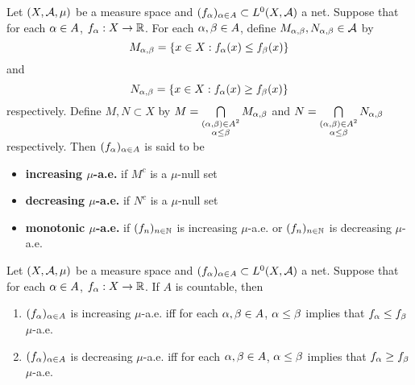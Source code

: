 \documentclass{book}
\begin{document}
	\begin{defn} 
		Let $(X, \mathcal{A}, \mu)$ be a measure space and $(f_\alpha)_{\alpha \in A} \subset L^0(X, \mathcal{A})$ a net. Suppose that for each $\alpha \in A$, $f_{\alpha}:X \rightarrow \mathbb{R}$. For each $\alpha, \beta \in A$, define $M_{\alpha, \beta}, N_{\alpha, \beta} \in \mathcal{A}$ by
		$$M_{\alpha, \beta} = \{x \in X: f_{\alpha}(x) \leq f_{\beta}(x) \}$$ 
		and 
		$$N_{\alpha, \beta} = \{x \in X: f_{\alpha}(x) \geq f_{\beta}(x) \}$$
		respectively. Define $M,N \subset X$ by $M = \bigcap\limits_{\substack{(\alpha, \beta) \in A^2 \\ \alpha \leq \beta}} M_{\alpha, \beta}$ and $N = \bigcap\limits_{\substack{(\alpha, \beta) \in A^2 \\ \alpha \leq \beta}} N_{\alpha, \beta}$ respectively. Then $(f_{\alpha})_{\alpha \in A}$ is said to be 
		\begin{itemize}
			\item \textbf{increasing $\mu$-a.e.} if $M^c$ is a $\mu$-null set
			\item \textbf{decreasing $\mu$-a.e.} if $N^c$ is a $\mu$-null set
			\item \textbf{monotonic $\mu$-a.e.} if $(f_n)_{n \in \mathbb{N}}$ is increasing $\mu$-a.e. or $(f_n)_{n \in \mathbb{N}}$ is decreasing $\mu$-a.e.
		\end{itemize} 
	\end{defn}

	\begin{ex} 
		Let $(X, \mathcal{A}, \mu)$ be a measure space and $(f_\alpha)_{\alpha \in A} \subset L^0(X, \mathcal{A})$ a net. Suppose that for each $\alpha \in A$, $f_{\alpha}:X \rightarrow \mathbb{R}$. If $A$ is countable, then 
		\begin{enumerate}
			\item $(f_\alpha)_{\alpha \in A}$ is increasing $\mu$-a.e. iff for each $\alpha, \beta \in A$, $\alpha \leq \beta$ implies that $f_{\alpha} \leq f_{\beta}$ $\mu$-a.e.
			\item $(f_\alpha)_{\alpha \in A}$ is decreasing $\mu$-a.e. iff for each $\alpha, \beta \in A$, $\alpha \leq \beta$ implies that $f_{\alpha} \geq f_{\beta}$ $\mu$-a.e.
		\end{enumerate}
	\end{ex}
\end{document}
